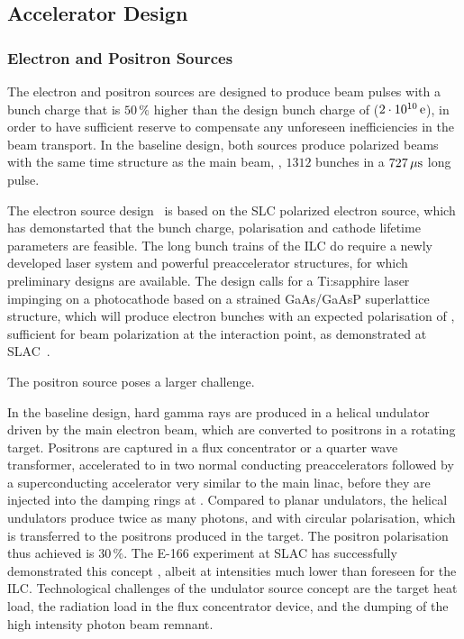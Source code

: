 
\subsection{Accelerator Design}

\subsubsection{Electron and Positron Sources}

The electron and positron sources are designed to produce  beam pulses with a bunch charge that is $50\,\%$ higher than the design bunch charge of  ($2\cdot 10^{10}\,{\mathrm{e}}$), in order to have sufficient reserve to compensate  any unforeseen inefficiencies in the beam transport.
In the baseline design, both sources produce polarized beams with the same time structure as the main beam, \ie, $1312$ bunches in a $727\,{\mathrm{\mu s}}$ long pulse.

The electron source design~\cite{Adolphsen:2013kya} is based on the SLC polarized electron source, which has demonstarted that the bunch charge, polarisation and cathode lifetime parameters are feasible.
The long bunch trains of the ILC do require a newly developed laser system and powerful preaccelerator structures, for which preliminary designs are available.
The design calls for  a Ti:sapphire laser impinging on a photocathode based on a strained GaAs/GaAsP superlattice
structure, which will produce electron bunches with an expected polarisation of ,
sufficient for  beam polarization at the interaction point, as demonstrated at SLAC~\cite{Alley:1995ia}.

The positron source poses a larger challenge. 

In the baseline design, hard gamma rays are produced in a helical undulator driven by the main electron beam, which are converted to positrons in a rotating target.
Positrons are captured in a flux concentrator or a quarter wave transformer, accelerated to  in two normal conducting preaccelerators followed by a superconducting accelerator very similar to the main linac, before they are injected into the damping rings at .
Compared to planar undulators, the helical undulators produce twice as many photons, and with circular polarisation, which is transferred to the positrons produced in the target.
The positron polarisation thus achieved is $30\,\%$.
The E-166 experiment at SLAC has successfully demonstrated this concept  \cite{Alexander:2009nb}, albeit at intensities much lower than foreseen for the ILC. 
Technological challenges of the undulator source concept are the target heat load, the radiation load in the flux concentrator device, and the dumping of 
the high intensity photon beam remnant.

